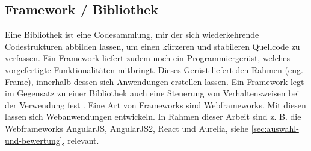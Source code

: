 \subsection{Framework / Bibliothek}
Eine Bibliothek ist eine Codesammlung, mir der sich wiederkehrende Codestrukturen abbilden lassen, um einen kürzeren und stabileren Quellcode zu verfassen. Ein Framework liefert zudem noch ein  Programmiergerüst, welches vorgefertigte Funktionalitäten mitbringt. Dieses Gerüst liefert den Rahmen (eng. Frame), innerhalb dessen sich Anwendungen erstellen lassen. Ein Framework legt im Gegensatz zu einer Bibliothek auch eine Steuerung von Verhaltensweisen bei der Verwendung fest \cite[S. 20]{steyer2011jquery}. Eine Art von Frameworks sind Webframeworks. Mit diesen lassen sich Webanwendungen entwickeln. In Rahmen dieser Arbeit sind z. B. die Webframeworks AngularJS, AngularJS2, React und Aurelia, siehe \autoref{sec:auswahl-und-bewertung}, relevant.